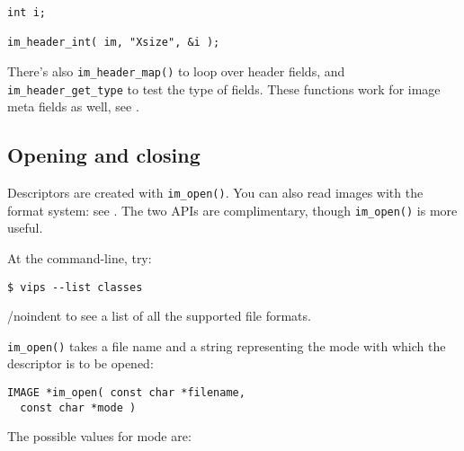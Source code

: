 \begin{verbatim}
int i;

im_header_int( im, "Xsize", &i );
\end{verbatim}

There's also \verb+im_header_map()+ to loop over header fields, and
\verb+im_header_get_type+ to test the type of fields. These functions work for
image meta fields as well, see .

\subsection{Opening and closing}
\label{sec:open}

Descriptors are created with \verb+im_open()+. You can also read images with
the format system: see . The two APIs are complimentary,
though \verb+im_open()+ is more useful.

At the command-line, try:

\begin{verbatim}
$ vips --list classes
\end{verbatim}

/noindent
to see a list of all the supported file formats.

\verb+im_open()+ takes a file name and a string representing the mode with
which the descriptor is to be opened:

\begin{verbatim}
IMAGE *im_open( const char *filename, 
  const char *mode )
\end{verbatim}

The possible values for mode are:
  

